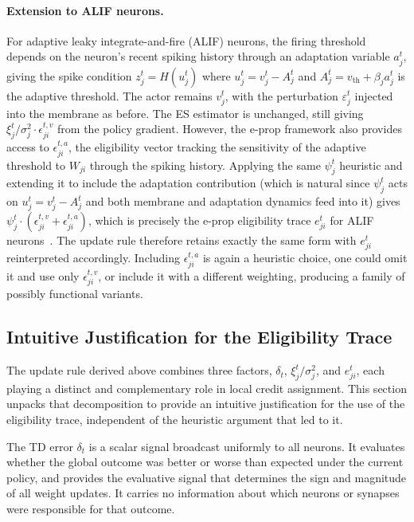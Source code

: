     \paragraph{Extension to ALIF neurons.}
    For adaptive leaky integrate-and-fire (ALIF) neurons, the firing threshold
    depends on the neuron's recent spiking history through an adaptation variable
    $a_j^t$, giving the spike condition $z_j^t = H(u_j^t)$ where $u_j^t =
    v_j^t - A_j^t$ and $A_j^t = v_{\mathrm{th}} + \beta_j a_j^t$ is the adaptive
    threshold.
    The actor remains $v_j^t$, with the perturbation $\varepsilon_j^t$ injected
    into the membrane as before.
    The ES estimator is unchanged, still giving $\xi_j^t / \sigma_j^2 \cdot
    \epsilon_{ji}^{t,v}$ from the policy gradient.
    However, the e-prop framework also provides access to $\epsilon_{ji}^{t,a}$,
    the eligibility vector tracking the sensitivity of the adaptive threshold to
    $W_{ji}$ through the spiking history.
    Applying the same $\psi_j^t$ heuristic and extending it to include the
    adaptation contribution (which is natural since $\psi_j^t$ acts on $u_j^t =
    v_j^t - A_j^t$ and both membrane and adaptation dynamics feed into it) gives
    $\psi_j^t \cdot (\epsilon_{ji}^{t,v} + \epsilon_{ji}^{t,a})$, which is
    precisely the e-prop eligibility trace $e_{ji}^t$ for ALIF
    neurons~\cite{eprop2020}.
    The update rule therefore retains exactly the same form with $e_{ji}^t$
    reinterpreted accordingly.
    Including $\epsilon_{ji}^{t,a}$ is again a heuristic choice, one could omit
    it and use only $\epsilon_{ji}^{t,v}$, or include it with a different
    weighting, producing a family of possibly functional variants.
    
    \subsection{Intuitive Justification for the Eligibility Trace}
    \label{subsec:etrace_intuition}
    
    The update rule derived above combines three factors, $\delta_t$,
    $\xi_j^t / \sigma_j^2$, and $e_{ji}^t$, each playing a distinct and
    complementary role in local credit assignment.
    This section unpacks that decomposition to provide an intuitive justification
    for the use of the eligibility trace, independent of the heuristic argument
    that led to it.
    
    The TD error $\delta_t$ is a scalar signal broadcast uniformly to all neurons.
    It evaluates whether the global outcome was better or worse than expected under
    the current policy, and provides the evaluative signal that determines the sign
    and magnitude of all weight updates.
    It carries no information about which neurons or synapses were responsible for
    that outcome.
    
